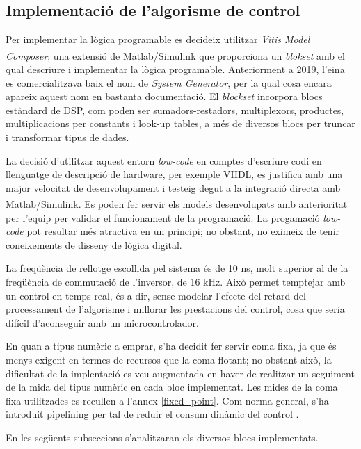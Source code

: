 \subsection{ Implementació de l'algorisme de control }
{
    Per implementar la lògica programable es decideix utilitzar \emph{Vitis
    Model Composer}, una extensió de Matlab/Simulink\textsuperscript{\textregistered}
    que proporciona un \emph{blokset} amb el qual descriure i implementar la lògica
    programable. Anteriorment a 2019, l'eina es comercialitzava baix el nom de
    \emph{System Generator}, per la qual cosa encara apareix aquest nom en
    bastanta documentació. El \emph{blockset} incorpora blocs estàndard de
    \ac{DSP}, com poden ser sumadors-restadors, multiplexors, productes,
    multiplicacions per constants i look-up tables, a més de diversos blocs per
    truncar i transformar tipus de dades. 

    La decisió d'utilitzar aquest entorn \emph{low-code} en comptes d'escriure
    codi en llenguatge de descripció de hardware, per exemple \acs{VHDL}, es
    justifica amb una major velocitat de desenvolupament i testeig degut a la
    integració directa amb Matlab/Simulink\textsuperscript{\textregistered}. Es
    poden fer servir els models desenvolupats amb anterioritat per l'equip per
    validar el funcionament de la programació. La progamació \emph{low-code}
    pot resultar més atractiva en un principi; no obstant, no eximeix de tenir
    coneixements de disseny de lògica digital.
    
    La freqüència de rellotge escollida pel sistema és de 10 ns, molt superior
    al de la freqüència de commutació de l'inversor, de 16 kHz. Això permet
    temptejar amb un control en temps real, és a dir, sense modelar l'efecte
    del retard del processament de l'algorisme i millorar les prestacions del
    control, cosa que seria difícil d'aconseguir amb un microcontrolador.
    
    En quan a tipus numèric a emprar, s'ha decidit fer servir coma fixa, ja que
    és menys exigent en termes de recursos que la coma flotant; no obstant
    això, la dificultat de la implentació es veu augmentada en haver de
    realitzar un seguiment de la mida del tipus numèric en cada bloc
    implementat. Les mides de la coma fixa utilitzades es recullen a l'annex
    \ref{fixed_point}. Com norma general, s'ha introduit pipelining per tal de
    reduir el consum dinàmic del control \cite{power_fpga}.

    En les següents subseccions s'analitzaran els diversos blocs implementats.

}
